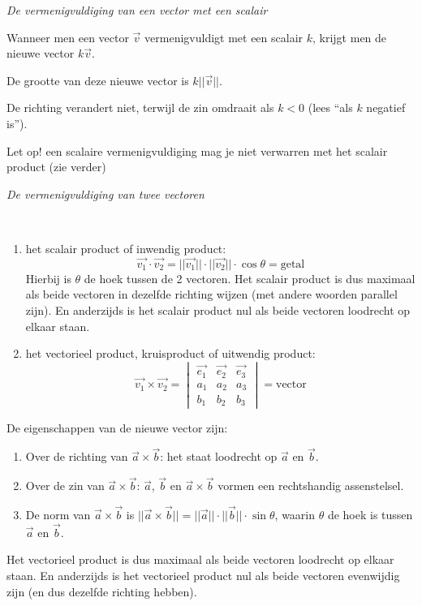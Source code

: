 \emph{De vermenigvuldiging van een vector met een scalair}

\begin{definitie}
	Wanneer men een vector $\vec{v}$ vermenigvuldigt met een scalair $k$, krijgt men de nieuwe vector $k\vec{v}$. 
	
	De grootte van deze nieuwe vector is $k||\vec{v}||$.
	
	De richting verandert niet, terwijl de zin omdraait als $k<0$ (lees “als $k$ negatief is”).
\end{definitie}

\begin{opmerking}
	Let op! een scalaire vermenigvuldiging mag je niet verwarren met het scalair product (zie verder)
\end{opmerking}

\emph{De vermenigvuldiging van twee vectoren}

\begin{definitie}
	\ \\
\begin{enumerate}
	\item het scalair product of inwendig product:
	\begin{equation*}
	\vec{v_1} \cdot \vec{v_2} = ||\vec{v_1}|| \cdot  ||\vec{v_2}|| \cdot \cos \theta = \text{getal}
	\end{equation*}
	Hierbij is $\theta$ de hoek tussen de 2 vectoren. Het scalair product is dus maximaal als beide vectoren in dezelfde richting wijzen (met andere woorden parallel zijn). En anderzijds is het scalair product nul als beide vectoren loodrecht op elkaar staan.

	\item het vectorieel product, kruisproduct of uitwendig product:
	\begin{equation*}
	\vec{v_1} \times \vec{v_2} = \begin{vmatrix}
	\vec{e_1} & \vec{e_2} & \vec{e_3} \\
	a_1 & a_2 & a_3 \\
	b_1 & b_2 & b_3 
	\end{vmatrix} = \text{vector}
	\end{equation*} 
\end{enumerate}
\end{definitie}
De eigenschappen van de nieuwe vector zijn:

\begin{enumerate}
	\item Over de richting van $\vec{a} \times \vec{b}$: het staat loodrecht op $\vec{a}$ en $\vec{b}$.
	\item Over de zin van $\vec{a} \times \vec{b}$: $\vec{a}$, $\vec{b}$  en $\vec{a} \times \vec{b}$ vormen een rechtshandig assenstelsel.
	\item De norm van $\vec{a} \times \vec{b}$ is $||\vec{a} \times \vec{b}||=||\vec{a}||\cdot||\vec{b}||\cdot \sin \theta$, waarin $\theta$ de hoek is tussen $\vec{a}$ en $\vec{b}$.
\end{enumerate}
Het vectorieel product is dus maximaal als beide vectoren loodrecht op elkaar staan. En anderzijds is het vectorieel product nul als beide vectoren evenwijdig zijn (en dus dezelfde richting hebben).

